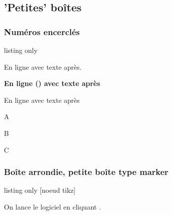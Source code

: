 \documentclass[french,11pt,a4paper]{article}
\begin{document}
\subsection{'Petites' boîtes}

\subsubsection{Numéros encerclés}

\begin{DemoCode}{listing only}
\end{DemoCode}

\begin{DemoCode}{}
En ligne  avec texte après.
\end{DemoCode}

\begin{DemoCode}{}
{\bfseries\sffamily\Huge En ligne () avec texte après}
\end{DemoCode}

\begin{DemoCode}{}
{\Large En ligne  avec texte après}
\end{DemoCode}

\begin{DemoCode}{}
\begin{enumerate}[label={\CircledNumber[raise=false]{\arabic*}}]
	\item A
	\item B
	\item C
\end{enumerate}
\end{DemoCode}

\subsubsection{Boîte arrondie, petite boîte type marker}

\begin{DemoCode}{listing only}
[noeud tikz]
\end{DemoCode}

\begin{DemoCode}{}
On lance le logiciel  en cliquant .
\end{DemoCode}
\end{document}
